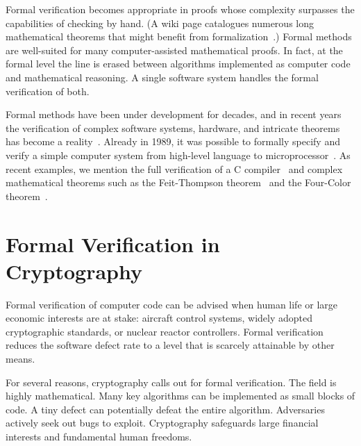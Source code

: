 \documentclass[11pt]{amsart} %
\begin{document}
Formal verification becomes appropriate in proofs whose complexity surpasses the capabilities of checking by hand.
(A wiki page catalogues numerous long mathematical theorems that might benefit
from formalization~\cite{WikiLong}.)  
Formal methods are well-suited for many computer-assisted mathematical proofs.  
In fact, at the formal level the line is erased between algorithms implemented as computer code
and mathematical reasoning.  A single software system
 handles  the formal verification of both.  

Formal methods have been under development for decades, and in recent years the verification
of complex software systems, hardware, and intricate theorems has become a reality~\cite{FVI}.  
Already in 1989, it was possible to formally specify and verify a simple computer system from high-level language
to microprocessor~\cite{BHMY}.  As recent examples, 
we mention the full
verification of a C compiler~\cite{CC-Web}
and complex mathematical theorems such as the Feit-Thompson theorem~\cite{OOT-13} and the Four-Color theorem~\cite{gonthier:2008:formal}.


\section{Formal Verification in Cryptography}

Formal verification of computer code can be advised when
human life or large economic interests are at stake:   
aircraft control systems, widely adopted cryptographic standards, or nuclear reactor controllers.
Formal verification reduces the software defect rate to a level that is
scarcely attainable by other means.

For several reasons,  cryptography calls out for formal verification.
The field is highly mathematical.  Many key algorithms can be implemented as
small blocks of code.  A tiny defect can potentially defeat the entire algorithm.
Adversaries actively seek out bugs to exploit.
Cryptography safeguards
large financial interests and fundamental human freedoms.
\end{document}
